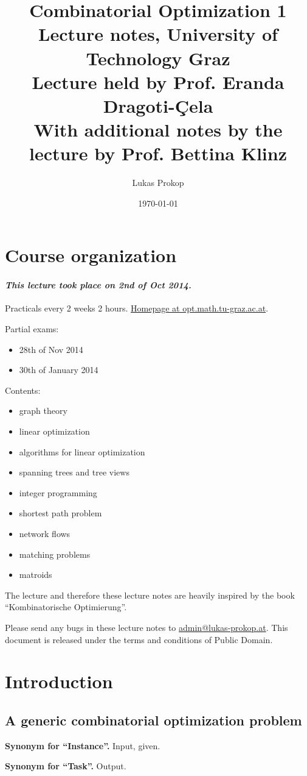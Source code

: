 \documentclass[a4paper]{article}
\title{
  Combinatorial Optimization 1 \\
  \large{Lecture notes, University of Technology Graz} \\
  \small{Lecture held by Prof. Eranda Dragoti-Çela} \\
  \small{With additional notes by the lecture by Prof. Bettina Klinz}
}
\date{\today}
\author{Lukas Prokop}
\theoremstyle{definition}
\newcommand{\dateref}[1]{\paragraph{\textit{This lecture took place on #1.}}}
\newcommand{\synonym}[2]{\textbf{Synonym for ``#1''.} #2.\par}
\begin{document}
\maketitle
\tableofcontents

\section{Course organization}
%
\dateref{2nd of Oct 2014}

Practicals every 2 weeks 2 hours.
\href{http://opt.math.tu-graz.ac.at/~cela/Vorlesungen/KombOpt1/main.htm}{Homepage at opt.math.tu-graz.ac.at}.

Partial exams:
\begin{itemize}
  \item 28th of Nov 2014
  \item 30th of January 2014
\end{itemize}

Contents:
\begin{itemize}
  \item graph theory
  \item linear optimization
  \item algorithms for linear optimization
  \item spanning trees and tree views
  \item integer programming
  \item shortest path problem
  \item network flows
  \item matching problems
  \item matroids
\end{itemize}

The lecture and therefore these lecture notes are heavily inspired by the book ``Kombinatorische Optimierung''.

Please send any bugs in these lecture notes to \href{mailto:admin@lukas-prokop.at}{admin@lukas-prokop.at}.
This document is released under the terms and conditions of Public Domain.

\newpage
\section{Introduction}

\subsection{A generic combinatorial optimization problem}
%
\synonym{Instance}{Input, given}
\synonym{Task}{Output}
\end{document}
